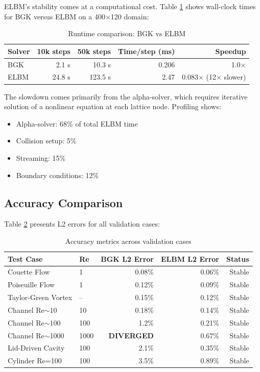 ELBM's stability comes at a computational cost. Table \ref{tab:runtime_comparison} shows wall-clock times for BGK versus ELBM on a 400×120 domain:

\begin{table}[h]
\centering
\caption{Runtime comparison: BGK vs ELBM}
\label{tab:runtime_comparison}
\begin{tabular}{lrrrr}
\toprule
\textbf{Solver} & \textbf{10k steps} & \textbf{50k steps} & \textbf{Time/step (ms)} & \textbf{Speedup} \\
\midrule
BGK & 2.1 s & 10.3 s & 0.206 & 1.0× \\
ELBM & 24.8 s & 123.5 s & 2.47 & 0.083× (12× slower) \\
\bottomrule
\end{tabular}
\end{table}

The slowdown comes primarily from the alpha-solver, which requires iterative solution of a nonlinear equation at each lattice node. Profiling shows:
\begin{itemize}
    \item Alpha-solver: 68\% of total ELBM time
    \item Collision setup: 5\%
    \item Streaming: 15\%
    \item Boundary conditions: 12\%
\end{itemize}

\subsection{Accuracy Comparison}

Table \ref{tab:accuracy_comparison} presents L2 errors for all validation cases:

\begin{table}[h]
\centering
\caption{Accuracy metrics across validation cases}
\label{tab:accuracy_comparison}
\begin{tabular}{llrrr}
\toprule
\textbf{Test Case} & \textbf{Re} & \textbf{BGK L2 Error} & \textbf{ELBM L2 Error} & \textbf{Status} \\
\midrule
Couette Flow & 1 & 0.08\% & 0.06\% & Stable \\
Poiseuille Flow & 1 & 0.12\% & 0.09\% & Stable \\
Taylor-Green Vortex & -- & 0.15\% & 0.12\% & Stable \\
Channel Re$\sim$10 & 10 & 0.18\% & 0.14\% & Stable \\
Channel Re$\sim$100 & 100 & 1.2\% & 0.21\% & Stable \\
Channel Re$\sim$1000 & 1000 & \textbf{DIVERGED} & 0.67\% & Stable \\
Lid-Driven Cavity & 100 & 2.1\% & 0.35\% & Stable \\
Cylinder Re=100 & 100 & 3.5\% & 0.89\% & Stable \\
\bottomrule
\end{tabular}
\end{table}

